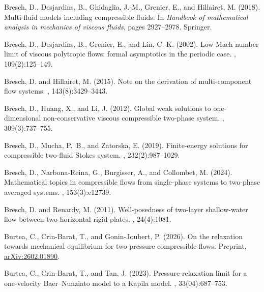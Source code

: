 \documentclass[11pt, twoside, a4paper]{article}
\theoremstyle{plain}
\theoremstyle{remark}
\numberwithin{equation}{section}
\begin{document}
\begin{thebibliography}{}
Bresch, D., Desjardins, B., Ghidaglia, J.-M., Grenier, E., and Hillairet, M.
  (2018).
\newblock Multi-fluid models including compressible fluids.
\newblock In {\em Handbook of mathematical analysis in mechanics of viscous
  fluids}, pages 2927--2978. Springer.

Bresch, D., Desjardins, B., Grenier, E., and Lin, C.-K. (2002).
\newblock Low {M}ach number limit of viscous polytropic flows: formal
  asymptotics in the periodic case.
, 109(2):125--149.

Bresch, D. and Hillairet, M. (2015).
\newblock Note on the derivation of multi-component flow systems.
, 143(8):3429--3443.

Bresch, D., Huang, X., and Li, J. (2012).
\newblock Global weak solutions to one-dimensional non-conservative viscous
  compressible two-phase system.
, 309(3):737--755.

Bresch, D., Mucha, P.~B., and Zatorska, E. (2019).
\newblock Finite-energy solutions for compressible two-fluid {S}tokes system.
, 232(2):987--1029.

Bresch, D., Narbona-Reina, G., Burgisser, A., and Collombet, M. (2024).
\newblock Mathematical topics in compressible flows from single-phase systems
  to two-phase averaged systems.
, 153(3):e12739.

Bresch, D. and Renardy, M. (2011).
\newblock Well-posedness of two-layer shallow-water flow between two horizontal
  rigid plates.
, 24(4):1081.

Burtea, C., Crin-Barat, T., and Gonin-Joubert, P. (2026).
\newblock On the relaxation towards mechanical equilibrium for two-pressure
  compressible flows.
\newblock Preprint, \href{https://arxiv.org/abs/2602.01890}{arXiv:2602.01890}.

Burtea, C., Crin-Barat, T., and Tan, J. (2023).
\newblock Pressure-relaxation limit for a one-velocity {B}aer--{N}unziato model
  to a {K}apila model.
, 33(04):687--753.


\end{thebibliography}
\end{document}
